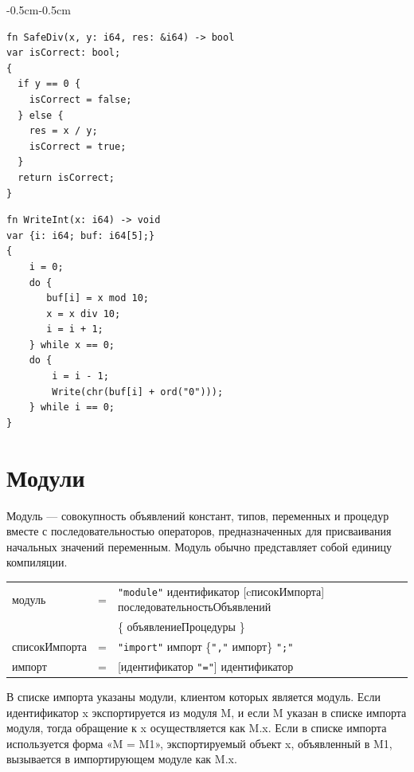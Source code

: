 \documentclass[a4paper,12pt]{article}
\newcommand{\lit}[1]{\texttt{"#1"}}
\begin{document}
    \begin{adjustwidth}{-0.5cm}{-0.5cm}
        \begin{minipage}[t]{0.53\textwidth}
            \begin{lstlisting}[style=obouldstyle]
fn SafeDiv(x, y: i64, res: &i64) -> bool
var isCorrect: bool;
{
  if y == 0 {
    isCorrect = false;
  } else {
    res = x / y;
    isCorrect = true;
  }
  return isCorrect;
}
            \end{lstlisting}
        \end{minipage}
        \hfill
        \begin{minipage}[t]{0.5\textwidth}
            \begin{lstlisting}[style=obouldstyle]
fn WriteInt(x: i64) -> void
var {i: i64; buf: i64[5];}
{
    i = 0;
    do {
       buf[i] = x mod 10;
       x = x div 10;
       i = i + 1;
    } while x == 0;
    do {
        i = i - 1;
        Write(chr(buf[i] + ord("0")));
    } while i == 0;
}
            \end{lstlisting}
        \end{minipage}
    \end{adjustwidth}

    \section{Модули}

    Модуль — совокупность объявлений констант, типов, переменных и процедур вместе с последовательностью операторов, предназначенных для присваивания начальных значений переменным. Модуль обычно представляет собой единицу компиляции.

    \begin{center}
        \begin{tabular}{l c l}
            модуль & = & \lit{module} идентификатор [cписокИмпорта] последовательностьОбъявлений \\
            & & \{ объявлениеПроцедуры \} \\
            списокИмпорта & = & \lit{import} импорт \{\lit{,} импорт\} \lit{;} \\
            импорт & = & [идентификатор \lit{=}] идентификатор
        \end{tabular}
    \end{center}

    В списке импорта указаны модули, клиентом которых является модуль. Если идентификатор x экспортируется из модуля M, и если M указан в списке импорта модуля, тогда обращение к x осуществляется как M.x. Если в списке импорта используется форма «M = M1», экспортируемый объект x, объявленный в M1, вызывается в импортирующем модуле как M.x.
\end{document}
